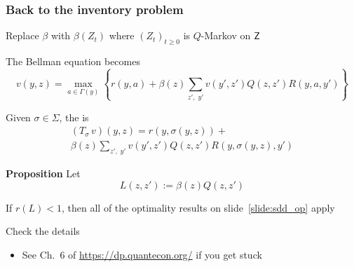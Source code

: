 \documentclass[xcolor=tex,dvipsnames]{beamer}
\begin{document}
\begin{frame}
    \frametitle{Back to the inventory problem}

    Replace $\beta$ with $\beta(Z_t)$ where 
        $(Z_t)_{t \geq 0}$ is $Q$-Markov on $\mathsf Z$

    \vspace{0.5em}
    The Bellman equation becomes
    \begin{equation*}
         v(y, z) =
         \max_{a \in \Gamma(y)}
         \left\{
             r(y, a) + \beta(z) 
                 \sum_{z', \; y'}
                v(y', z') Q(z, z') R(y, a, y')
            \right\}
    \end{equation*}

    \vspace{0.5em}
    Given $\sigma \in \Sigma$, the  is
    \begin{multline*}
        (T_\sigma \, v)(y, z) =
             r(y, \sigma(y, z)) + 
             \\
             \beta(z) 
             \sum_{z' , \; y'}
                v(y', z') Q(z, z') R(y, \sigma(y, z), y')
    \end{multline*}


\end{frame}



\begin{frame}


    \begin{block}{\vspace*{-3ex}}

    {\bf Proposition} 
    Let
    $$L(z, z') := \beta(z) Q(z, z')$$

    \vspace{0.5em}
    If $r(L)<1$, then all of the optimality results on slide~\ref{slide:sdd_op}
    apply

    \end{block}

    \vspace{0.5em}
    \vspace{0.5em}

    \Ex Check the details

    \vspace{0.5em}
    \vspace{0.5em}
    \vspace{0.5em}
    \begin{itemize}
        \item See Ch.\ 6 of \url{https://dp.quantecon.org/} if you get stuck
    \end{itemize}

\end{frame}
\end{document}
